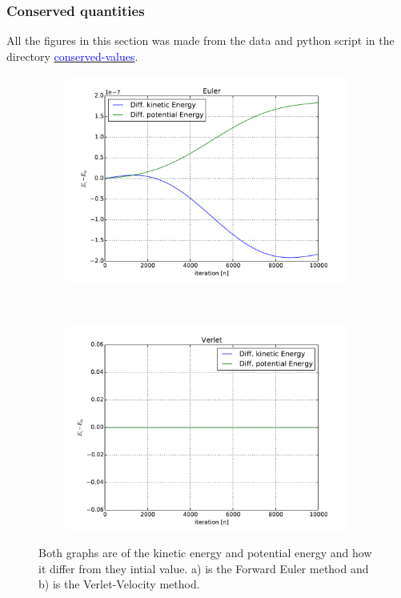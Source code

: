 \subsubsection{Conserved quantities}

All the figures in this section was made from the data and python script in the directory \href{https://github.com/erikfsk/Project-3/tree/master/Project3/conserved-values}{\textcolor{blue}{conserved-values}}.

\begin{figure}[H]
    \centering
    \begin{subfigure}{0.5\textwidth}
        \centering
        \includegraphics[width=\linewidth]{result/bilder/kin-pot-euler.pdf}
    	\caption{}
    \end{subfigure}%
    ~ 
    \begin{subfigure}{0.5\textwidth}
        \centering
        \includegraphics[width=\linewidth]{result/bilder/kin-pot-verlet.pdf}
        \caption{}
    \end{subfigure}
    \caption{Both graphs are of the kinetic energy and potential energy and how it differ from they intial value. a) is the Forward Euler method and b) is the Verlet-Velocity method.}
    \label{fig:conserved-energy}
\end{figure}

